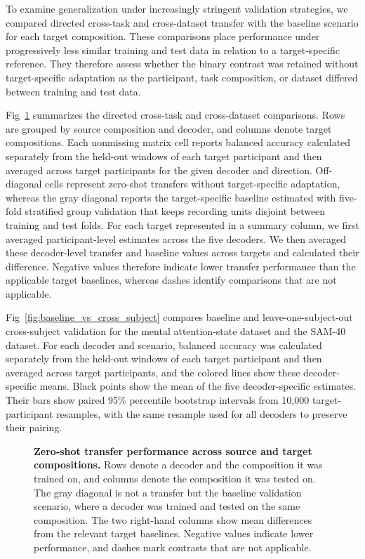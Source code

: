 \documentclass[10pt,letterpaper]{article}
\begin{document}
To examine generalization under increasingly stringent validation strategies,
we compared directed cross-task and cross-dataset transfer with the
baseline scenario for each target composition. These comparisons place
performance under progressively less similar training and test data in relation
to a target-specific reference. They therefore assess whether the binary
contrast was retained without target-specific adaptation as the participant,
task composition, or dataset differed between training and test data.

Fig~\ref{fig:transfer_matrix} summarizes the directed cross-task and
cross-dataset comparisons. Rows are grouped by source composition and decoder,
and columns denote target compositions. Each nonmissing matrix cell reports
balanced accuracy calculated separately from the held-out windows of each
target participant and then averaged across target participants for the given
decoder and direction. Off-diagonal cells represent zero-shot transfers without
target-specific adaptation, whereas the gray diagonal reports the
target-specific baseline estimated with five-fold stratified group validation
that keeps recording units disjoint between training and test folds. For each
target represented in a summary column, we first averaged participant-level
estimates across the five decoders. We then averaged these decoder-level
transfer and baseline values across targets and calculated their difference.
Negative values therefore indicate lower transfer performance than the
applicable target baselines, whereas dashes identify comparisons that are not
applicable.

Fig~\ref{fig:baseline_vs_cross_subject} compares baseline and
leave-one-subject-out cross-subject validation for the mental attention-state
dataset and the SAM-40 dataset. For each decoder and scenario, balanced accuracy was
calculated separately from the held-out windows of each target participant and
then averaged across target participants, and the colored lines show these
decoder-specific means. Black points show the mean of the five decoder-specific
estimates. Their bars show paired 95\% percentile bootstrap intervals from
10,000 target-participant resamples, with the same resample used for all
decoders to preserve their pairing.

\begin{figure}[H]
\centering
\caption{\textbf{Zero-shot transfer performance across source and target compositions.} Rows denote a decoder and the composition it was trained on, and columns denote the composition it was tested on. The gray diagonal is not a transfer but the baseline validation scenario, where a decoder was trained and tested on the same composition. The two right-hand columns show mean differences from the relevant target baselines. Negative values indicate lower performance, and dashes mark contrasts that are not applicable.}
\label{fig:transfer_matrix}
\end{figure}
\end{document}
